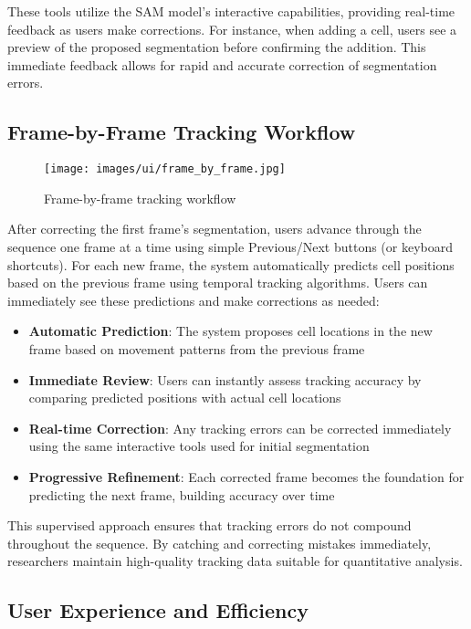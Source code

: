 \documentclass[../cellseek_paper.tex]{subfiles}
\begin{document}
These tools utilize the SAM model's interactive capabilities, providing real-time feedback as users make corrections. For instance, when adding a cell, users see a preview of the proposed segmentation before confirming the addition. This immediate feedback allows for rapid and accurate correction of segmentation errors.

\subsection{Frame-by-Frame Tracking Workflow}

\begin{figure}[H]
  \centering
  \texttt{[image: images/ui/frame\_by\_frame.jpg]}
  \caption{Frame-by-frame tracking workflow}
  \label{fig:frame_by_frame}
\end{figure}

After correcting the first frame's segmentation, users advance through the sequence one frame at a time using simple Previous/Next buttons (or keyboard shortcuts). For each new frame, the system automatically predicts cell positions based on the previous frame using temporal tracking algorithms. Users can immediately see these predictions and make corrections as needed:

\begin{itemize}
  \item \textbf{Automatic Prediction}: The system proposes cell locations in the new frame based on movement patterns from the previous frame
  \item \textbf{Immediate Review}: Users can instantly assess tracking accuracy by comparing predicted positions with actual cell locations
  \item \textbf{Real-time Correction}: Any tracking errors can be corrected immediately using the same interactive tools used for initial segmentation
  \item \textbf{Progressive Refinement}: Each corrected frame becomes the foundation for predicting the next frame, building accuracy over time
\end{itemize}

This supervised approach ensures that tracking errors do not compound throughout the sequence. By catching and correcting mistakes immediately, researchers maintain high-quality tracking data suitable for quantitative analysis.

\subsection{User Experience and Efficiency}
\end{document}
